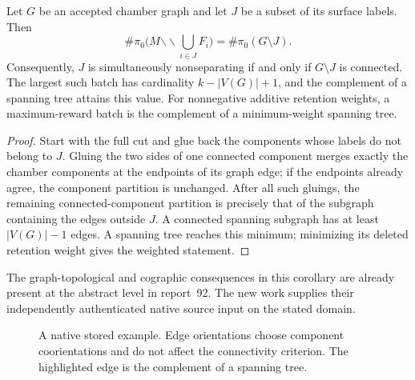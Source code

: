 \begin{corollary}
\label{cor:batch-optimizer}
Let $G$ be an accepted chamber graph and let $J$ be a subset of its surface
labels. Then
\[
 \#\pi_0\bigl(M\mathbin{\backslash\!\backslash}
                \textstyle\bigcup_{i\in J}F_i\bigr)
   =\#\pi_0(G\setminus J).
\]
Consequently, $J$ is simultaneously nonseparating if and only if
$G\setminus J$ is connected. The largest such batch has cardinality
$k-|V(G)|+1$, and the complement of a spanning tree attains this value.
For nonnegative additive retention weights, a maximum-reward batch is the
complement of a minimum-weight spanning tree.
\end{corollary}
\begin{proof}
Start with the full cut and glue back the components whose labels do not
belong to $J$. Gluing the two sides of one connected component merges exactly
the chamber components at the endpoints of its graph edge; if the endpoints
already agree, the component partition is unchanged. After all such gluings,
the remaining connected-component partition is precisely that of the
subgraph containing the edges outside $J$. A connected spanning subgraph has
at least $|V(G)|-1$ edges. A spanning tree reaches this minimum; minimizing
its deleted retention weight gives the weighted statement.
\end{proof}

The graph-topological and cographic consequences in this corollary are
already present at the abstract level in report~92. The new work supplies
their independently authenticated native source input on the stated domain.

\begin{figure}[htbp]
\centering
{}
\caption{A native stored example. Edge orientations choose component
coorientations and do not affect the connectivity criterion. The highlighted
edge is the complement of a spanning tree.}
\label{fig:three-meridians}
\end{figure}


